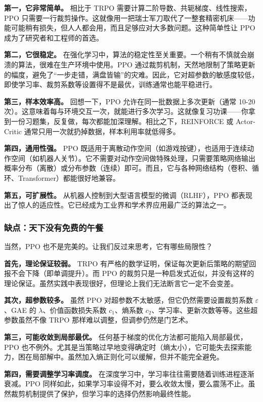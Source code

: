 \documentclass[lang=cn,zihao=-4,a4paper,fontset=windows]{beautybook}
\begin{document}
\textbf{第一，它非常简单。} 相比于 TRPO 需要计算二阶导数、共轭梯度、线性搜索，PPO 只需要一行裁剪操作。这就像用一把瑞士军刀取代了一整套精密机床——功能可能稍有损失，但人人都会用，而且足够应对大多数问题。这种简单性让 PPO 成为了研究者和工程师的首选。

\textbf{第二，它很稳定。} 在强化学习中，算法的稳定性至关重要。一个稍有不慎就会崩溃的算法，很难在生产环境中使用。PPO 通过裁剪机制，天然地限制了策略更新的幅度，避免了“一步走错，满盘皆输”的灾难。因此，它对超参数的敏感度较低，即使学习率、裁剪系数等设置得不是最优，训练通常也能平稳进行。

\textbf{第三，样本效率高。} 回想一下，PPO 允许在同一批数据上多次更新（通常 10-20 次）。这意味着每与环境交互一次，就能进行多次学习。这就像复习功课——你拿到一份习题集，反复做，每次都能加深理解。相比之下，REINFORCE 或 Actor-Critic 通常只用一次就扔掉数据，样本利用率就低得多。

\textbf{第四，通用性强。} PPO 既适用于离散动作空间（如游戏按键），也适用于连续动作空间（如机器人关节）。它不需要对动作空间做特殊处理，只需要策略网络输出概率分布（离散）或分布参数（连续）即可。而且，它与各种网络结构（卷积、循环、Transformer）都能很好地兼容。

\textbf{第五，可扩展性。} 从机器人控制到大型语言模型的微调（RLHF），PPO 都表现出了惊人的适应性。它已经成为工业界和学术界应用最广泛的算法之一。

\subsubsection{缺点：天下没有免费的午餐}

当然，PPO 也不是完美的。让我们反过来思考，它有哪些局限性？

\textbf{首先，理论保证较弱。} TRPO 有严格的数学证明，保证每次更新后策略的期望回报不会下降（即单调提升）。而 PPO 的裁剪只是一种启发式近似，并没有这样的理论保证。虽然实践中表现很好，但理论上我们无法断言它一定不会变差。

\textbf{其次，超参数较多。} 虽然 PPO 对超参数不太敏感，但它仍然需要设置裁剪系数 \(\varepsilon\)、GAE 的 \(\lambda\)、价值函数损失系数 \(c_1\)、熵系数 \(c_2\)、学习率、更新次数等等。这些超参数虽然不像 TRPO 那样难以调整，但调参仍然是门艺术。

\textbf{第三，可能收敛到局部最优。} 任何基于梯度的优化方法都可能陷入局部最优，PPO 也不例外。尤其是当策略过早地变得确定时（熵太小），它可能失去探索能力，困在局部解中。虽然加入熵正则化可以缓解，但并不能完全避免。

\textbf{第四，需要调整学习率调度。} 在深度学习中，学习率往往需要随着训练进程逐渐衰减。PPO 同样如此，如果学习率设得不对，要么收敛太慢，要么震荡不止。虽然裁剪机制提供了保护，但学习率的选择仍然影响最终性能。
\end{document}
